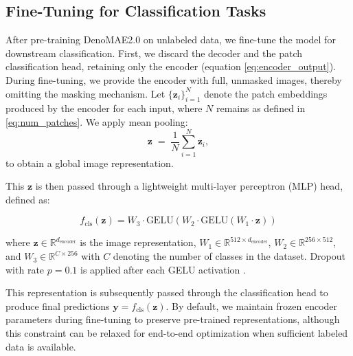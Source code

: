 \subsection{Fine-Tuning for Classification Tasks}

After pre-training DenoMAE2.0 on unlabeled data, we fine-tune the
model for downstream classification. First, we discard the decoder
and the patch classification head, retaining only the encoder
(equation \eqref{eq:encoder_output}). During fine-tuning, we provide the
encoder with full, unmasked images, thereby omitting the masking
mechanism. Let \(\{ \mathbf{z}_{i} \}_{i=1}^{N}\) denote the patch
embeddings produced by the encoder for each input, where \(N\)
remains as defined in \eqref{eq:num_patches}. We apply mean pooling:
\begin{equation}
  \label{eq:global_representation}
  \mathbf{z}
  \;=\;
  \frac{1}{N}
  \sum_{i=1}^{N}
  \mathbf{z}_{i},
\end{equation}
to obtain a global image representation. 

This \(\mathbf{z}\) is then
passed through a lightweight multi-layer perceptron (MLP) head, defined as:

\begin{equation}
f_{\text{cls}}(\mathbf{z}) = W_3 \cdot \text{GELU}(W_2 \cdot \text{GELU}(W_1 \cdot \mathbf{z}))
\end{equation}

where $\mathbf{z} \in \mathbb{R}^{d_{\text{encoder}}}$ is the image representation, $W_1 \in \mathbb{R}^{512 \times d_{\text{encoder}}}$, $W_2 \in \mathbb{R}^{256 \times 512}$, and $W_3 \in \mathbb{R}^{C \times 256}$ with $C$ denoting the number of classes in the dataset. Dropout with rate $p=0.1$ is applied after each GELU activation \cite{hendrycks2016gaussian}.

This representation is subsequently passed through the classification head to produce final predictions $\mathbf{y} = f_{\text{cls}}(\mathbf{z})$. By default, we maintain frozen encoder parameters during fine-tuning to preserve pre-trained representations, although this constraint can be relaxed for end-to-end optimization when sufficient labeled data is available.

